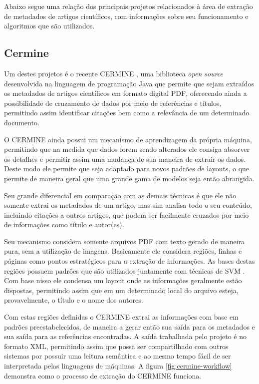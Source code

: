 \documentclass[
	12pt,               %
	openright,          %
	twoside,            %
	a4paper,            %
	english,            %
	brazil              %
	]{abntex2}
\begin{document}
Abaixo segue uma relação dos principais projetos relacionados à área de extração de metadados de artigos científicos, com informações sobre seu funcionamento e algoritmos que são utilizados.

\subsection{Cermine}


Um destes projetos é o recente CERMINE \cite{cermine}, uma biblioteca \textit{open source} desenvolvida na linguagem de programação Java que permite que sejam extraídos os metadados de artigos científicos em formato digital PDF, oferecendo ainda a possibilidade de cruzamento de dados por meio de referências e títulos, permitindo assim identificar citações bem como a relevância de um determinado documento.

O CERMINE ainda possui um mecanismo de aprendizagem da própria máquina, permitindo que na medida que dados forem sendo alterados ele consiga absorver os detalhes e permitir assim uma mudança de sua maneira de extrair os dados. Deste modo ele permite que seja adaptado para novos padrões de layouts, o que permite de maneira geral que uma grande gama de modelos seja então abrangida. 

Seu grande diferencial em comparação com as demais técnicas é que ele não somente extrai os metadados de um artigo, mas sim analisa todo o seu conteúdo, incluindo citações a outros artigos, que podem ser facilmente cruzados por meio de informações como título e autor(es).

Seu mecanismo considera somente arquivos PDF com texto gerado de maneira pura, sem a utilização de imagens. Basicamente ele considera regiões, linhas e páginas como pontos estratégicos para a extração de informações. As bases destas regiões possuem padrões que são utilizados juntamente com técnicas de SVM \cite{svm}. Com base nisso ele condensa um layout onde as informações geralmente estão dispostas, permitindo assim que em um determinado local do arquivo esteja, provavelmente, o título e o nome dos autores. 

Com estas regiões definidas o CERMINE extrai as informações com base em padrões preestabelecidos, de maneira a gerar então sua saída para os metadados e sua saída para as referências encontradas. A saída trabalhada pelo projeto é no formato XML, permitindo assim que possa ser compartilhado com outros sistemas por possuir uma leitura semântica e ao mesmo tempo fácil de ser interpretada pelas linguagens de máquinas. A figura \ref{fig:cermine-workflow} demonstra como o processo de extração do CERMINE funciona.
\end{document}
